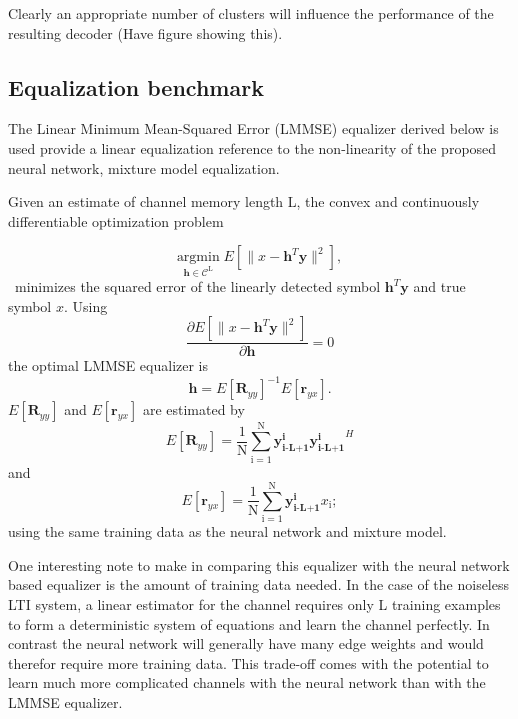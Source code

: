 \documentclass[12pt,a4paper]{report}
\begin{document}
\par 
Clearly an appropriate number of clusters will influence the performance of the resulting decoder (Have figure showing this).

\subsection{Equalization benchmark}
The Linear Minimum Mean-Squared Error (LMMSE) equalizer derived below is used provide a linear equalization reference to the non-linearity of the proposed neural network, mixture model equalization.
\par
Given an estimate of channel memory length L, the convex and continuously differentiable optimization problem 

\begin{equation*}\label{mmse}
\underset{\mathbf{\mathbf{h}} \in \textit{$\mathcal{C}^{\text{L}}$}}{\text{argmin}} \;
 E[\|x-\mathbf{h}^T\mathbf{y}\|^2],
\end{equation*}\
minimizes the squared error of the linearly detected symbol $\mathbf{h}^T\mathbf{y}$ and true symbol $x$.
Using
\begin{equation*}\label{mmse}
\frac{\partial  E[\|x-\mathbf{h}^T\mathbf{y}\|^2]}{\partial \mathbf{h} } = 0
\end{equation*}
the optimal LMMSE equalizer is \cite{proakis1988introduction}
\begin{equation*}\label{mmse}
\mathbf{h} = E[\mathbf{R}_{yy}]^{-1}E[\mathbf{r}_{yx}].
\end{equation*}
$E[\mathbf{R}_{yy}]$ and $E[\mathbf{r}_{yx}]$ are estimated by
\begin{equation*}\label{mmse}
 E[\mathbf{R}_{yy}]= \frac{1}{\mathrm{N}}\sum_{\mathrm{i=1}}^{\mathrm{N}}
\mathbf{y^{\text{i}}_{\text{i-L+1}}}\mathbf{y^{\text{i}}_{\text{i-L+1}}}^H
 \end{equation*}
 and
\begin{equation*}\label{mmse}
E[\mathbf{r}_{yx}]= \frac{1}{\mathrm{N}}\sum_{\mathrm{i=1}}^{\mathrm{N}}
\mathbf{y^{\text{i}}_{\text{i-L+1}}}x_{\text{i}}
;
 \end{equation*}
 using the same training data as the neural network and mixture model. 
 
\par
One interesting note to make in comparing this equalizer with the neural network based equalizer is the amount of training data needed. In the case of the noiseless LTI system, a linear estimator for the channel requires only L training examples to form a deterministic system of equations and learn the channel perfectly. In contrast the neural network will generally have many edge weights and would therefor require more training data. This trade-off comes with the potential to learn much more complicated channels with the neural network than with the LMMSE equalizer.
 
\end{document}

